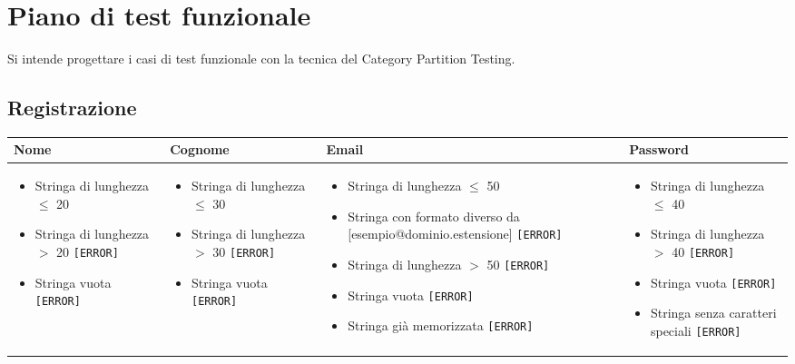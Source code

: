 \chapter{Piano di test funzionale}
Si intende progettare i casi di test funzionale con la tecnica del Category Partition Testing. 

\section{Registrazione}

\begin{table}[H]
\begin{tabularx}{\textwidth}{|X|X|X|X|}
\hline
\textbf{Nome} & \textbf{Cognome} & \textbf{Email} & \textbf{Password} \\
\hline
\begin{itemize}[leftmargin=*]
\item Stringa di lunghezza $\leq$ 20
\item Stringa di lunghezza $>$ 20 \texttt{[ERROR]}
\item Stringa vuota \texttt{[ERROR]}
\end{itemize} &
\begin{itemize}[leftmargin=*]
\item Stringa di lunghezza $\leq$ 30
\item Stringa di lunghezza $>$ 30 \texttt{[ERROR]}
\item Stringa vuota \texttt{[ERROR]}
\end{itemize} &
\begin{itemize}[leftmargin=*]
\item Stringa di lunghezza $\leq$ 50
\item Stringa con formato diverso da [esempio@dominio.estensione] \texttt{[ERROR]}
\item Stringa di lunghezza $>$ 50 \texttt{[ERROR]}
\item Stringa vuota \texttt{[ERROR]}
\item Stringa già memorizzata \texttt{[ERROR]}
\end{itemize} &
\begin{itemize}[leftmargin=*]
\item Stringa di lunghezza $\leq$ 40
\item Stringa di lunghezza $>$ 40 \texttt{[ERROR]}
\item Stringa vuota \texttt{[ERROR]}
\item Stringa senza caratteri speciali \texttt{[ERROR]}
\end{itemize} \\
\hline
\end{tabularx}
\end{table}

